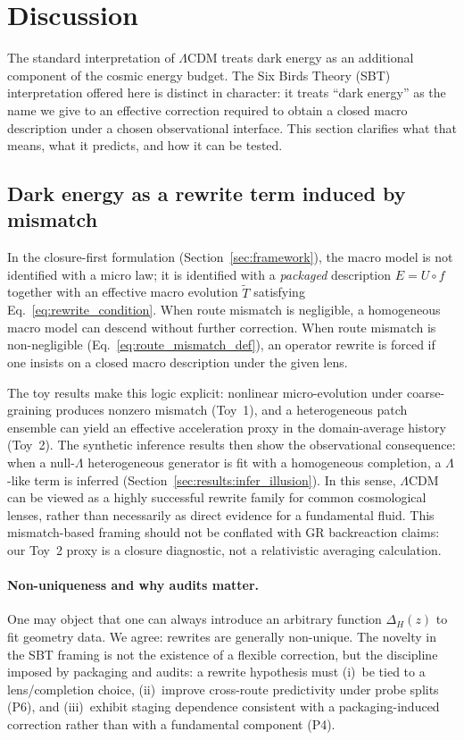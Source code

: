 \documentclass[11pt]{article}
\newcommand{\Lens}{f}              \newcommand{\Completion}{U}        \newcommand{\PackageOp}{E}
\theoremstyle{definition}
\theoremstyle{plain}
\theoremstyle{remark}
\begin{document}
\section{Discussion}\label{sec:discussion}
The standard interpretation of $\Lambda$CDM treats dark energy as an additional component of the cosmic energy budget. The Six Birds Theory (SBT) interpretation offered here is distinct in character: it treats ``dark energy'' as the name we give to an effective correction required to obtain a closed macro description under a chosen observational interface. This section clarifies what that means, what it predicts, and how it can be tested.

\subsection{Dark energy as a rewrite term induced by mismatch}\label{sec:discussion:rewrite}
In the closure-first formulation (Section~\ref{sec:framework}), the macro model is not identified with a micro law; it is identified with a \emph{packaged} description $\PackageOp = \Completion\circ\Lens$ together with an effective macro evolution $\widetilde{T}$ satisfying Eq.~\eqref{eq:rewrite_condition}. When route mismatch is negligible, a homogeneous macro model can descend without further correction. When route mismatch is non-negligible (Eq.~\eqref{eq:route_mismatch_def}), an operator rewrite is forced if one insists on a closed macro description under the given lens.

The toy results make this logic explicit: nonlinear micro-evolution under coarse-graining produces nonzero mismatch (Toy~1), and a heterogeneous patch ensemble can yield an effective acceleration proxy in the domain-average history (Toy~2). The synthetic inference results then show the observational consequence: when a null-$\Lambda$ heterogeneous generator is fit with a homogeneous completion, a $\Lambda$-like term is inferred (Section~\ref{sec:results:infer_illusion}). In this sense, $\Lambda$CDM can be viewed as a highly successful rewrite family for common cosmological lenses, rather than necessarily as direct evidence for a fundamental fluid.
This mismatch-based framing should not be conflated with GR backreaction claims: our Toy~2 proxy is a closure diagnostic, not a relativistic averaging calculation.

\paragraph{Non-uniqueness and why audits matter.}
One may object that one can always introduce an arbitrary function $\Delta_H(z)$ to fit geometry data.
We agree: rewrites are generally non-unique.
The novelty in the SBT framing is not the existence of a flexible correction, but the discipline imposed by packaging and audits: a rewrite hypothesis must (i)~be tied to a lens/completion choice, (ii)~improve cross-route predictivity under probe splits (P6), and (iii)~exhibit staging dependence consistent with a packaging-induced correction rather than with a fundamental component (P4).
\end{document}

